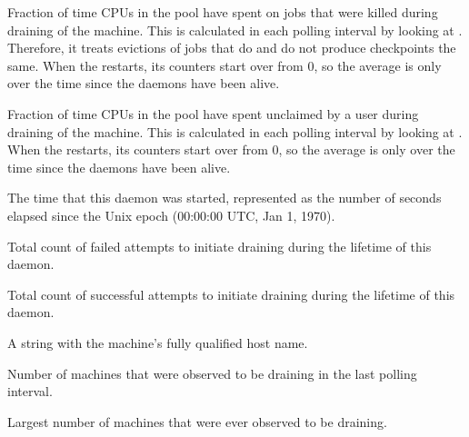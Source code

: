 \begin{description}

\item[\AdAttr{AvgDrainingBadput}:] Fraction of time CPUs
  in the pool have spent on jobs that were killed during draining of the
  machine.  This is calculated in each polling interval by looking
  at .  
  Therefore, it treats evictions of jobs that do and do not produce
  checkpoints the same.
  When the  restarts, its counters start over from 0, so the
  average is only over the time since the daemons have been alive.

\item[\AdAttr{AvgDrainingUnclaimedTime}:] Fraction of time CPUs
  in the pool have spent unclaimed by a user during
  draining of the machine.  This is calculated in each polling interval
  by looking at .  
  When the  restarts, its counters start over from 0, so the
  average is only over the time since the daemons have been alive.

\item[\AdAttr{DaemonStartTime}:] The time that this daemon was started, 
  represented as the number of seconds elapsed since
  the Unix epoch (00:00:00 UTC, Jan 1, 1970).

\item[\AdAttr{DrainFailures}:] Total count of failed attempts
  to initiate draining during the lifetime of this  daemon.

\item[\AdAttr{DrainSuccesses}:] Total count of successful attempts
  to initiate draining during the lifetime of this  daemon.

\item[\AdAttr{Machine}:] A string with the machine's fully qualified 
  host name.

\item[\AdAttr{MachinesDraining}:] Number of machines that were observed
  to be draining in the last polling interval.

\item[\AdAttr{MachinesDrainingPeak}:] Largest number of machines that were
ever observed to be draining.


\end{description}
